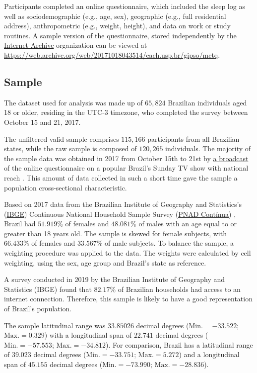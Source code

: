 \documentclass[
12pt,
openright,
oneside,
a4paper,
chapter=TITLE,
section=TITLE,
french,
spanish,
brazil,
english
]{abntex2}
\begin{document}
Participants completed an online questionnaire, which included the sleep
log as well as sociodemographic (e.g., age, sex), geographic (e.g., full
residential address), anthropometric (e.g., weight, height), and data on
work or study routines. A sample version of the questionnaire, stored
independently by the \href{https://archive.org/}{Internet Archive}
organization can be viewed at
\url{https://web.archive.org/web/20171018043514/each.usp.br/gipso/mctq}.

\subsection{Sample}\label{sample}

The dataset used for analysis was made up of \(65,824\) Brazilian
individuals aged 18 or older, residing in the UTC-3 timezone, who
completed the survey between October 15 and 21, 2017.

The unfiltered valid sample comprises \(115,166\) participants from all
Brazilian states, while the raw sample is composed of \(120,265\)
individuals. The majority of the sample data was obtained in 2017 from
October 15th to 21st by \href{https://globoplay.globo.com/v/6219513/}{a
broadcast} of the online questionnaire on a popular Brazil's Sunday TV
show with national reach \autocite{redeglobo2017}. This amount of data
collected in such a short time gave the sample a population
cross-sectional characteristic.

Based on 2017 data from the Brazilian Institute of Geography and
Statistics's (\href{https://www.ibge.gov.br/}{IBGE}) Continuous National
Household Sample Survey
(\href{https://www.ibge.gov.br/estatisticas/sociais/trabalho/17270-pnad-continua.html}{PNAD
Contínua}) \autocite{ibgee}, Brazil had \(51.919\%\) of females and
\(48.081\%\) of males with an age equal to or greater than 18 years old.
The sample is skewed for female subjects, with \(66.433\%\) of females
and \(33.567\%\) of male subjects. To balance the sample, a weighting
procedure was applied to the data. The weights were calculated by cell
weighting, using the sex, age group and Brazil's state as reference.

A survey conducted in 2019 by the Brazilian Institute of Geography and
Statistics (IBGE) \autocite*{ibge2021} found that \(82.17\%\) of
Brazilian households had access to an internet connection. Therefore,
this sample is likely to have a good representation of Brazil's
population.

The sample latitudinal range was \(33.85026\) decimal degrees
(\(\text{Min.} = -33.522\); \(\text{Max.} = 0.329\)) with a longitudinal
span of \(22.741\) decimal degrees (\(\text{Min.} = -57.553\);
\(\text{Max.} = -34.812\)). For comparison, Brazil has a latitudinal
range of \(39.023\) decimal degrees (\(\text{Min.} = -33.751\);
\(\text{Max.} = 5.272\)) and a longitudinal span of \(45.155\) decimal
degrees (\(\text{Min.} = -73.990\); \(\text{Max.} = -28.836\)).
\end{document}
